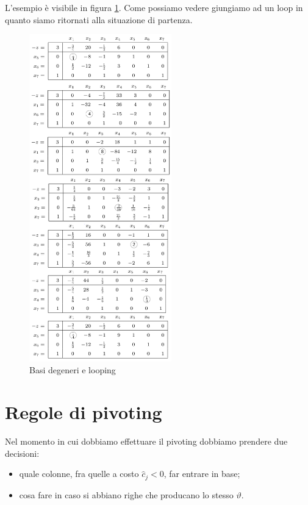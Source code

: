 \documentclass[11pt]{book}
\begin{document}
L'esempio \`e visibile in figura \ref{td}.  Come possiamo vedere
giungiamo ad un loop in quanto siamo ritornati alla situazione di
partenza.

\begin{figure}[h!]
  \centering
  \includegraphics[width=0.55\textwidth]{images/td.png}
  \caption{Basi degeneri e looping}
  \label{td}
\end{figure}

\section{Regole di pivoting}

Nel momento in cui dobbiamo effettuare il pivoting dobbiamo prendere
due decisioni:

\begin{itemize}

\item quale colonne, fra quelle a costo $\hat{c}_j < 0$, far entrare
  in base;

\item cosa fare in caso si abbiano righe che producano lo stesso
  $\vartheta$.

\end{itemize}
\end{document}
